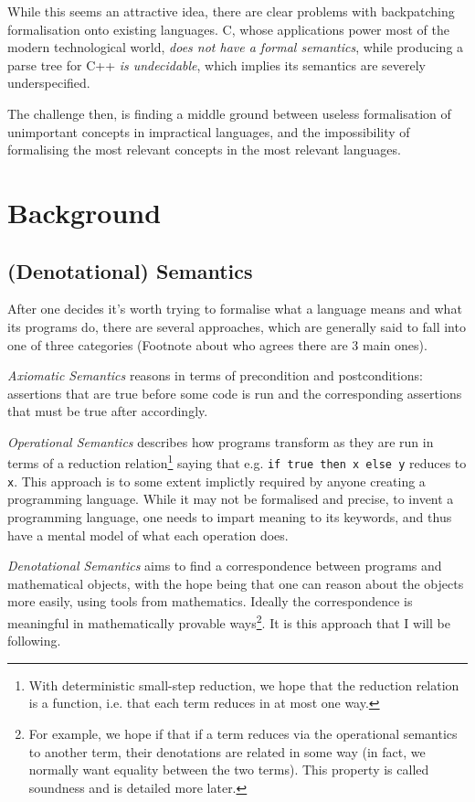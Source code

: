 \documentclass[12pt,a4paper,twoside,openright]{report}
\begin{document}
While this seems an attractive idea, there are clear problems with backpatching formalisation onto existing languages. C, whose applications power most of the modern technological world, \textit{does not have a formal semantics}\cite{C-semantics}, while producing a parse tree for C++ \textit{is undecidable}\cite{C++-undecidable}, which implies its semantics are severely underspecified. 

The challenge then, is finding a middle ground between useless formalisation of unimportant concepts in impractical languages, and the impossibility of formalising the most relevant concepts in the most relevant languages. 

\section{Background}
\subsection{(Denotational) Semantics}
After one decides it's worth trying to formalise what a language means and what its programs do, there are several approaches, which are generally said to fall into one of three categories (Footnote about who agrees there are 3 main ones).

\textit{Axiomatic Semantics} reasons in terms of precondition and postconditions: assertions that are true before some code is run and the corresponding assertions that must be true after accordingly.

\textit{Operational Semantics} describes how programs transform as they are run in terms of a reduction relation\footnote{With deterministic small-step reduction, we hope that the reduction relation is a function, i.e. that each term reduces in at most one way.} saying that e.g. \texttt{if true then x else y} reduces to \texttt{x}. This approach is to some extent implictly required by anyone creating a programming language. While it may not be formalised and precise, to invent a programming language, one needs to impart meaning to its keywords, and thus have a mental model of what each operation does. 

\textit{Denotational Semantics} aims to find a correspondence between programs and mathematical objects, with the hope being that one can reason about the objects more easily, using tools from mathematics. Ideally the correspondence is meaningful in mathematically provable ways\footnote{For example, we hope if that if a term reduces via the operational semantics to another term, their denotations are related in some way (in fact, we normally want equality between the two terms). This property is called soundness and is detailed more later.}. It is this approach that I will be following. 
\end{document}
